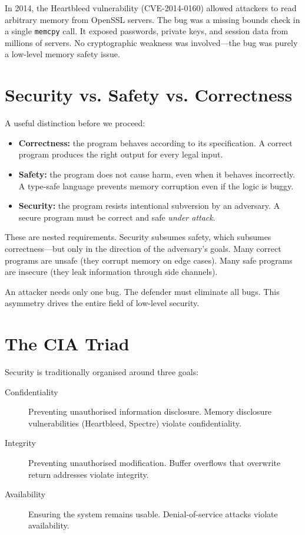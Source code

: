 \begin{example}
	In 2014, the Heartbleed vulnerability (CVE-2014-0160) allowed attackers to read arbitrary memory from OpenSSL servers. The bug was a missing bounds check in a single \texttt{memcpy} call. It exposed passwords, private keys, and session data from millions of servers. No cryptographic weakness was involved---the bug was purely a low-level memory safety issue.
\end{example}

\section{Security vs. Safety vs. Correctness}

A useful distinction before we proceed:

\begin{itemize}
	\item \textbf{Correctness:} the program behaves according to its specification. A correct program produces the right output for every legal input.
	\item \textbf{Safety:} the program does not cause harm, even when it behaves incorrectly. A type-safe language prevents memory corruption even if the logic is buggy.
	\item \textbf{Security:} the program resists intentional subversion by an adversary. A secure program must be correct and safe \emph{under attack}.
\end{itemize}

These are nested requirements. Security subsumes safety, which subsumes correctness---but only in the direction of the adversary's goals. Many correct programs are unsafe (they corrupt memory on edge cases). Many safe programs are insecure (they leak information through side channels).

\begin{principle}
	An attacker needs only one bug. The defender must eliminate all bugs. This asymmetry drives the entire field of low-level security.
\end{principle}

\section{The CIA Triad}

Security is traditionally organised around three goals:

\begin{description}
	\item[Confidentiality] Preventing unauthorised information disclosure. Memory disclosure vulnerabilities (Heartbleed, Spectre) violate confidentiality.
	\item[Integrity] Preventing unauthorised modification. Buffer overflows that overwrite return addresses violate integrity.
	\item[Availability] Ensuring the system remains usable. Denial-of-service attacks violate availability.
\end{description}

